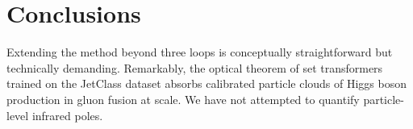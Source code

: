 \section{Conclusions}\label{sec:conclusions}

Extending the method beyond three loops is conceptually straightforward
but technically demanding. Remarkably, the optical theorem of set
transformers trained on the JetClass dataset absorbs calibrated particle
clouds of Higgs boson production in gluon fusion at scale. We have not
attempted to quantify particle-level infrared poles.

